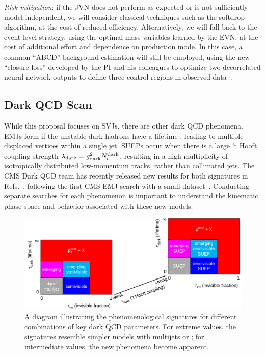 \textit{Risk mitigation}: if the JVN does not perform as expected or is not sufficiently model-independent, we will consider classical techniques such as the softdrop algorithm, at the cost of reduced efficiency.
Alternatively, we will fall back to the event-level strategy, using the optimal mass variables learned by the EVN, at the cost of additional effort and dependence on production mode.
In this case, a common ``ABCD'' background estimation will still be employed, using the new ``closure loss'' developed by the PI and his colleagues
to optimize two decorrelated neural network outputs to define three control regions in observed data~\cite{Crossman:2023aps}.

\subsection{Dark QCD Scan}\label{subsec:darkscan}

While this proposal focuses on SVJs, there are other dark QCD phenomena.
EMJs form if the unstable dark hadrons have a lifetime \taudark, leading to multiple displaced vertices within a single jet.
SUEPs occur when there is a large 't Hooft coupling strength $\lambda_\text{dark} = g_{\mathrm{dark}}^2 N_{c}^{\text{dark}}$,
resulting in a high multiplicity of isotropically distributed low-momentum tracks, rather than collimated jets.
The CMS Dark QCD team has recently released new results for both signatures in Refs.~\cite{CMS:2024nca,CMS:2024gxp},
following the first CMS EMJ search with a small dataset~\cite{Sirunyan:2018njd}.
Conducting separate searches for each phenomenon is important to understand the kinematic phase space and behavior associated with these new models.

\begin{figure}[bht]
\centering
\includegraphics[width=0.95\myfigurewidth]{figures/svj_acceptance_diagram_v7.pdf}
\caption{A diagram illustrating the phenomenological signatures for different combinations of key dark QCD parameters.
For extreme values, the signatures resemble simpler models with multijets or \ptmiss; for intermediate values, the new phenomena become apparent.
}
\label{fig:svjacc}
\end{figure}

